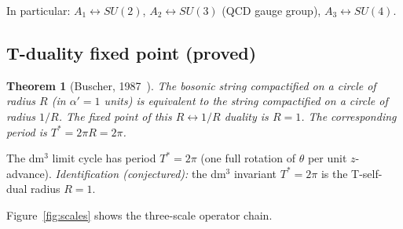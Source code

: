 \documentclass[12pt,a4paper]{article}
\theoremstyle{plain}
\newtheorem{theorem}{Theorem}[section]
\theoremstyle{definition}
\theoremstyle{remark}
\begin{document}
\noindent In particular:
$A_1\leftrightarrow SU(2)$, $A_2\leftrightarrow SU(3)$ (QCD gauge group),
$A_3\leftrightarrow SU(4)$.

\subsection{T-duality fixed point (proved)}

\begin{theorem}[Buscher, 1987~\cite{Buscher1987}]
The bosonic string compactified on a circle of radius $R$ (in $\alpha'=1$ units)
is equivalent to the string compactified on a circle of radius $1/R$.
The fixed point of this $R\leftrightarrow 1/R$ duality is $R=1$.
The corresponding period is $T^*=2\pi R=2\pi$.
\end{theorem}

The dm$^3$ limit cycle has period $T^*=2\pi$ (one full rotation of $\theta$
per unit $z$-advance).
\emph{Identification (conjectured):} the dm$^3$ invariant $T^*=2\pi$ is the
T-self-dual radius $R=1$.

Figure~\ref{fig:scales} shows the three-scale operator chain.
\end{document}
